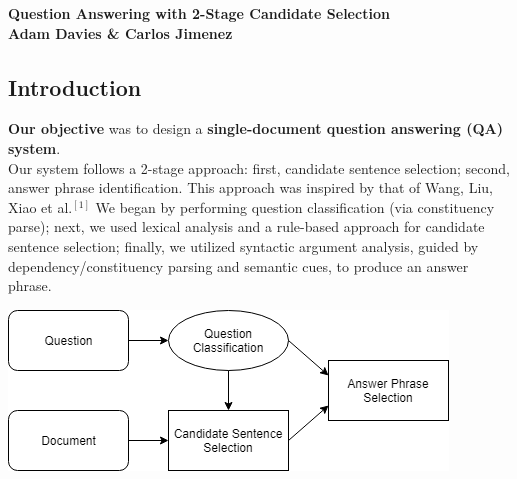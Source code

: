 \documentclass[a1,landscape]{a0poster}
\begin{document}
\begin{minipage}[c]{0.9\linewidth}
\centering
\Huge \color{NavyBlue} \textbf{Question Answering with 2-Stage Candidate Selection} \color{Black}\\ %
\LARGE \textbf{Adam Davies \& Carlos Jimenez}\\ %
\end{minipage}

\vspace{1cm} %


\begin{multicols}{3} %
\Large

\color{SaddleBrown} %

\section*{\LARGE Introduction}
\textbf{Our objective} was to design a \textbf{single-document question answering (QA) system}. \\
Our system follows a 2-stage approach: first, candidate sentence selection; second, answer phrase identification. This approach was inspired by that of Wang, Liu, Xiao et al.$^{[1]}$ We began by performing question classification (via constituency parse); next, we used lexical analysis and a rule-based approach for candidate sentence selection; finally, we utilized syntactic argument analysis, guided by dependency/constituency parsing and semantic cues, to produce an answer phrase.

\vspace{1ex}
\includegraphics[scale=1.5]{diagram-simple.png}


\end{multicols}
\end{document}
